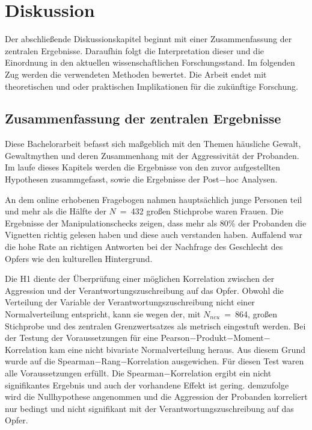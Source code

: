 \chapter{Diskussion}   \label{ch_5}
Der abschließende Diskussionskapitel beginnt mit einer Zusammenfassung der zentralen Ergebnisse. Daraufhin folgt die Interpretation dieser und die Einordnung in den aktuellen wissenschaftlichen Forschungsstand. Im folgenden Zug werden die verwendeten Methoden bewertet. Die Arbeit endet mit theoretischen und oder praktischen Implikationen für die zukünftige Forschung.


\section{Zusammenfassung der zentralen Ergebnisse}  \label{sec_5.1}
Diese Bachelorarbeit befasst sich maßgeblich mit den Themen häusliche Gewalt, Gewaltmythen und deren Zusammenhang mit der Aggressivität der Probanden. Im laufe dieses Kapitels werden die Ergebnisse von den zuvor aufgestellten Hypothesen zusammgefasst, sowie die Ergebnisse der Post$-$hoc Analysen.

An dem online erhobenen Fragebogen nahmen hauptsächlich junge Personen teil und mehr als die Hälfte der $N$~=~432 großen Stichprobe waren Frauen. 
Die Ergebnisse der Manipulationschecks zeigen, dass mehr als 80\% der Probanden die Vignetten richtig gelesen haben und diese auch verstanden haben. Auffalend war die hohe Rate an richtigen Antworten bei der Nachfrage des Geschlecht des Opfers wie den kulturellen Hintergrund.


Die H1 diente der Überprüfung einer möglichen Korrelation zwischen der Aggression und der Verantwortungszuschreibung auf das Opfer. Obwohl die Verteilung der Variable der Verantwortungszuschreibung nicht einer Normalverteilung entspricht, kann sie wegen der, mit $N_{neu}$~=~864, großen Stichprobe und des zentralen Grenzwertsatzes als metrisch eingestuft werden. 
Bei der Testung der Voraussetzungen für eine Pearson$-$Produkt$-$Moment$-$Korrelation kam eine nicht bivariate Normalverteilung heraus. Aus diesem Grund wurde auf die Spearman$-$Rang$-$Korrelation ausgewichen. Für diesen Test waren alle Voraussetzungen erfüllt. Die Spearman$-$Korrelation ergibt ein nicht signifikantes Ergebnis und auch der vorhandene Effekt ist gering. demzufolge wird die Nullhypothese angenommen und die Aggression der Probanden korreliert nur bedingt und nicht signifikant mit der Verantwortungszuschreibung auf das Opfer.

